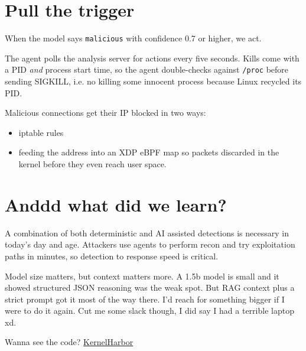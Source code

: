\section{Pull the trigger}

When the model says \texttt{malicious} with confidence 0.7 or higher, we act.

The agent polls the analysis server for actions every five seconds. Kills come with a PID \textit{and} process start time, so the agent double-checks against \texttt{/proc} before sending SIGKILL, i.e. no killing some innocent process because Linux recycled its PID.

Malicious connections get their IP blocked in two ways:
\begin{itemize}
\item iptable rules
\item feeding the address into an XDP eBPF map so packets discarded in the kernel before they even reach user space.
\end{itemize}

\section{Anddd what did we learn?}

A combination of both deterministic and AI assisted detections is necessary in today's day and age. Attackers use agents to perform recon and try exploitation paths in minutes, so detection to response speed is critical.

Model size matters, but context matters more. A 1.5b model is small and it showed structured JSON reasoning was the weak spot. But RAG context plus a strict prompt got it most of the way there. I'd reach for something bigger if I were to do it again. Cut me some slack though, I did say I had a terrible laptop xd.

Wanna see the code? \href{https://github.com/fr4nsyz/KernelHarbor}{KernelHarbor}


